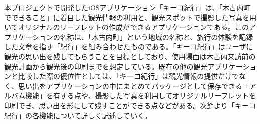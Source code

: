 本プロジェクトで開発したiOSアプリケーション「キーコ紀行」は、「木古内町でできること」に着目した観光情報の利用と、観光スポットで撮影した写真を用いてオリジナルのリーフレットの作成ができるアプリケーションである。このアプリケーションの名称は、「木古内町」という地域の名称と、旅行の体験を記録した文章を指す「紀行」を組み合わせたものである。「キーコ紀行」はユーザに観光の思い出を残してもらうことを目標としており、使用場面は木古内来訪前の観光計画から観光後の印刷までを想定している。既存の他の観光アプリケーションと比較した際の優位性としては、「キーコ紀行」は観光情報の提供だけでなく、思い出をアプリケーションの中にまとめてパッケージとして保存できる「アルバム機能」を有する点や、撮影した写真を利用してオリジナルリーフレットを印刷でき、思い出を形にして残すことができる点などがある。次節より「キーコ紀行」の各機能について詳しく記述していく。
